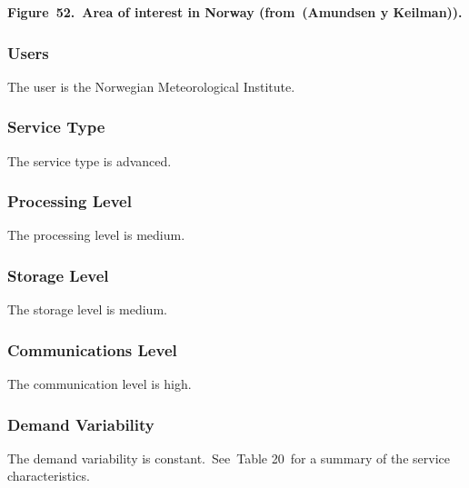 \documentclass[a4paper]{article}
\begin{document}
{\centering\bfseries
\label{bkm:Ref377556410}Figure\ 52.\ Area of interest in Norway
(from\ (Amundsen y Keilman)).
\par}


\bigskip

\subsubsection[Users]{ Users}
\hypertarget{Toc381777287}{}{
The user is the Norwegian Meteorological Institute.\ }

\subsubsection[Service Type]{ Service Type}
\hypertarget{Toc381777288}{}{
The service type is advanced.}

\subsubsection[Processing Level]{ Processing
Level}
\hypertarget{Toc381777289}{}{
The processing level is medium.}

\subsubsection[Storage Level]{ Storage Level}
\hypertarget{Toc381777290}{}{
The storage level is medium.}

\subsubsection[Communications Level]{
Communications Level}
\hypertarget{Toc381777291}{}{
The communication level is high.}

\subsubsection[Demand Variability]{ Demand
Variability}
\hypertarget{Toc381777292}{}The demand variability is
constant.\ \foreignlanguage{english}{See\ }Table
20\foreignlanguage{english}{\ for a summary of the service
characteristics.}


\bigskip


\bigskip
\end{document}
